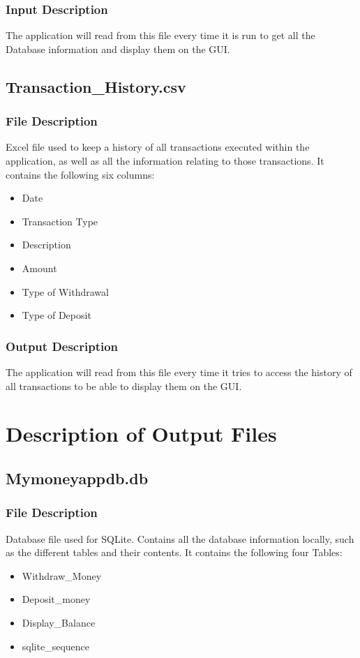 \documentclass[12pt]{article}
\begin{document}
\subsubsection{Input Description}
The application will read from this file every time it is run to get all the Database information and display them on the GUI.

\subsection{Transaction\_History.csv}

\subsubsection{File Description}
Excel file used to keep a history of all transactions executed within the application, as well as all the information relating to those transactions. It contains the following six columns:
\begin{itemize}
  \item Date
  \item Transaction Type
  \item Description
  \item Amount
  \item Type of Withdrawal
  \item Type of Deposit
\end{itemize}

\subsubsection{Output Description}
The application will read from this file every time it tries to access the history of all transactions to be able to display them on the GUI.

\section{Description of Output Files}

\subsection{Mymoneyappdb.db}

\subsubsection{File Description}
Database file used for SQLite. Contains all the database information locally, such as the different tables and their contents. It contains the following four Tables:
\begin{itemize}
  \item Withdraw\_Money
  \item Deposit\_money
  \item Display\_Balance
  \item sqlite\_sequence
\end{itemize}
\end{document}
